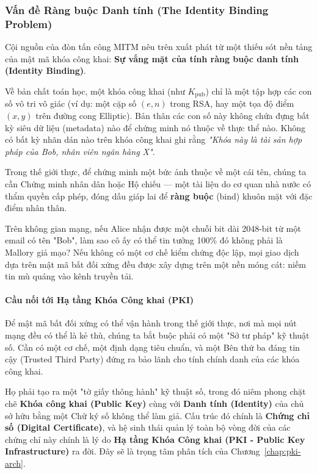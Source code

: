 \subsubsection*{Vấn đề Ràng buộc Danh tính (The Identity Binding Problem)}

Cội nguồn của đòn tấn công MITM nêu trên xuất phát từ một thiếu sót nền tảng của mật mã khóa công khai: \textbf{Sự vắng mặt của tính ràng buộc danh tính (Identity Binding)}.

Về bản chất toán học, một khóa công khai (như $K_{\mathrm{pub}}$) chỉ là một tập hợp các con số vô tri vô giác (ví dụ: một cặp số $(e, n)$ trong RSA, hay một tọa độ điểm $(x, y)$ trên đường cong Elliptic). Bản thân các con số này không chứa đựng bất kỳ siêu dữ liệu (metadata) nào để chứng minh nó thuộc về thực thể nào. Không có bất kỳ nhãn dán nào trên khóa công khai ghi rằng \textit{"Khóa này là tài sản hợp pháp của Bob, nhân viên ngân hàng X"}.

Trong thế giới thực, để chứng minh một bức ảnh thuộc về một cái tên, chúng ta cần Chứng minh nhân dân hoặc Hộ chiếu --- một tài liệu do cơ quan nhà nước có thẩm quyền cấp phép, đóng dấu giáp lai để \textbf{ràng buộc} (bind) khuôn mặt với đặc điểm nhân thân.

Trên không gian mạng, nếu Alice nhận được một chuỗi bit dài 2048-bit từ một email có tên "Bob", làm sao cô ấy có thể tin tưởng 100\% đó không phải là Mallory giả mạo? Nếu không có một cơ chế kiểm chứng độc lập, mọi giao dịch dựa trên mật mã bất đối xứng đều được xây dựng trên một nền móng cát: niềm tin mù quáng vào kênh truyền tải.

\paragraph*{Cầu nối tới Hạ tầng Khóa Công khai (PKI)}
Để mật mã bất đối xứng có thể vận hành trong thế giới thực, nơi mà mọi nút mạng đều có thể là kẻ thù, chúng ta bắt buộc phải có một "Sở tư pháp" kỹ thuật số. Cần có một cơ chế, một định dạng tiêu chuẩn, và một Bên thứ ba đáng tin cậy (Trusted Third Party) đứng ra bảo lãnh cho tính chính danh của các khóa công khai.

Họ phải tạo ra một "tờ giấy thông hành" kỹ thuật số, trong đó niêm phong chặt chẽ \textbf{Khóa công khai (Public Key)} cùng với \textbf{Danh tính (Identity)} của chủ sở hữu bằng một Chữ ký số không thể làm giả. Cấu trúc đó chính là \textbf{Chứng chỉ số (Digital Certificate)}, và hệ sinh thái quản lý toàn bộ vòng đời của các chứng chỉ này chính là lý do \textbf{Hạ tầng Khóa Công khai (PKI - Public Key Infrastructure)} ra đời. Đây sẽ là trọng tâm phân tích của Chương~\ref{chap:pki-arch}.
